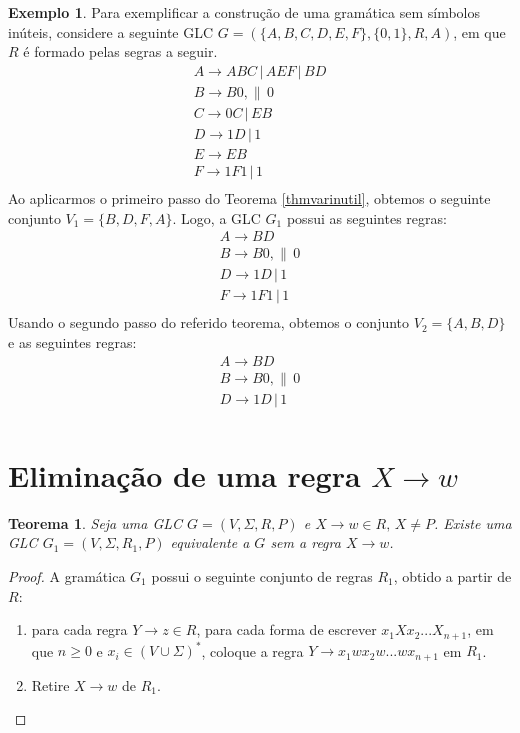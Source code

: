 \documentclass[a4paper]{article}
\newtheorem{Theorem}{Teorema}
\theoremstyle{definition}
\newtheorem{Example}{Exemplo}
\begin{document}
  \begin{Example}
    Para exemplificar a construção de uma gramática sem símbolos inúteis,
    considere a seguinte GLC $G = (\{A,B,C,D,E,F\},\{0,1\},R,A)$, em que $R$ é
    formado pelas segras a seguir.
    \[
      \begin{array}{l}
        A \to ABC \,|\, AEF\,|\,BD\\
        B \to B0 ,\|\,0\\
        C \to 0C\,|\,EB\\
        D \to 1D\,|\,1\\
        E \to EB \\
        F \to 1F1\,|\,1\\
      \end{array}
    \]
    Ao aplicarmos o primeiro passo do Teorema \ref{thmvarinutil}, obtemos o
    seguinte conjunto $V_1 =\{B,D,F,A\}$. Logo, a GLC $G_1$ possui as seguintes
    regras:
    \[
      \begin{array}{l}
        A \to BD\\
        B \to B0 ,\|\,0\\
        D \to 1D\,|\,1\\
        F \to 1F1\,|\,1\\
      \end{array}
    \]
    Usando o segundo passo do referido teorema, obtemos o conjunto $V_2
    =\{A,B,D\}$ e as seguintes regras:
    \[
      \begin{array}{l}
        A \to BD\\
        B \to B0 ,\|\,0\\
        D \to 1D\,|\,1\\
      \end{array}
    \]   
  \end{Example}

  \section{Eliminação de uma regra $X \to w$}

  \begin{Theorem}
    Seja uma GLC $G = (V,\Sigma,R,P)$ e $X \to w \in R,\, X\neq P$. Existe uma
    GLC $G_1 = (V, \Sigma, R_1, P)$ equivalente a $G$ sem a regra $X \to w$.
  \end{Theorem}
  \begin{proof}
    A gramática $G_1$ possui o seguinte conjunto de regras $R_1$, obtido a
    partir de $R$:
    \begin{enumerate}
    \item para cada regra $Y \to z \in R$, para cada forma de escrever
      $x_1Xx_2...X_{n + 1}$, em que $n\geq 0$ e $x_i \in (V\cup \Sigma)^*$,
      coloque a regra $Y \to x_1wx_2w...wx_{n+1}$ em $R_1$.
    \item Retire $X \to w$ de $R_1$.
    \end{enumerate}
  \end{proof}
\end{document}
